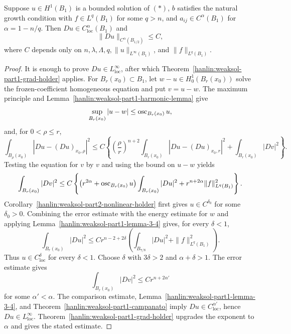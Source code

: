 \begin{theorem}\label{hanlin:weaksol-part2-nonlinear-gradient-holder}
Suppose $u\in H^1(B_1)$ is a bounded solution of $(\ast)$, $b$ satisfies
the natural growth condition with $f\in L^q(B_1)$ for some $q>n$, and
$a_{ij}\in C^\alpha(B_1)$ for $\alpha=1-n/q$. Then
$Du\in C^\alpha_{\mathrm{loc}}(B_1)$ and
\[
\|Du\|_{C^\alpha(B_{1/2})}\leq C,
\]
where $C$ depends only on
$n,\lambda,\Lambda,q,\|u\|_{L^\infty(B_1)}$, and
$\|f\|_{L^q(B_1)}$.
\end{theorem}
\begin{proof}
\sketch It is enough to prove $Du\in L^\infty_{\mathrm{loc}}$, after which
Theorem~\ref{hanlin:weaksol-part1-grad-holder} applies. For
$B_r(x_0)\subset B_1$, let
$w-u\in H^1_0(B_r(x_0))$ solve the frozen-coefficient homogeneous equation
and put $v=u-w$. The maximum principle and
Lemma~\ref{hanlin:weaksol-part1-harmonic-lemma} give
\begin{equation}
\sup_{B_r(x_0)}|u-w|\leq\operatorname{osc}_{B_r(x_0)}u,
\end{equation}
and, for $0<\rho\leq r$,
\begin{equation}
\int_{B_\rho(x_0)}|Du-(Du)_{x_0,\rho}|^2
\leq C\left\{
\left(\frac\rho r\right)^{n+2}
\int_{B_r(x_0)}|Du-(Du)_{x_0,r}|^2
+\int_{B_r(x_0)}|Dv|^2\right\}.
\end{equation}
Testing the equation for $v$ by $v$ and using the bound on $u-w$ yields
\begin{equation}
\int_{B_r(x_0)}|Dv|^2
\leq C\left\{
\bigl(r^{2\alpha}+\operatorname{osc}_{B_r(x_0)}u\bigr)
\int_{B_r(x_0)}|Du|^2
+r^{n+2\alpha}\|f\|_{L^q(B_1)}^2\right\}.
\end{equation}
Corollary~\ref{hanlin:weaksol-part2-nonlinear-holder} first gives
$u\in C^{\delta_0}$ for some $\delta_0>0$. Combining the error estimate
with the energy estimate for $w$ and applying
Lemma~\ref{hanlin:weaksol-part1-lemma-3-4} gives,
for every $\delta<1$,
\[
\int_{B_r(x_0)}|Du|^2
\leq Cr^{n-2+2\delta}
\left(\int_{B_{7/8}}|Du|^2+\|f\|_{L^q(B_1)}^2\right).
\]
Thus $u\in C^\delta_{\mathrm{loc}}$ for every $\delta<1$. Choose
$\delta$ with $3\delta>2$ and $\alpha+\delta>1$. The error estimate gives
\[
\int_{B_r(x_0)}|Dv|^2\leq Cr^{n+2\alpha'}
\]
for some $\alpha'<\alpha$. The comparison estimate,
Lemma~\ref{hanlin:weaksol-part1-lemma-3-4}, and
Theorem~\ref{hanlin:weaksol-part1-campanato} imply
$Du\in C^{\alpha'}_{\mathrm{loc}}$, hence
$Du\in L^\infty_{\mathrm{loc}}$.
Theorem~\ref{hanlin:weaksol-part1-grad-holder} upgrades the exponent to
$\alpha$ and gives the stated estimate.
\end{proof}
